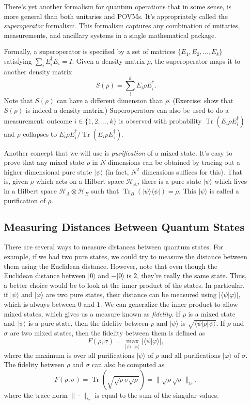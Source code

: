 \documentclass[11pt]{report}
\theoremstyle{plain}
\theoremstyle{definition}
\renewcommand{\bra}[1]{\langle#1|}
\renewcommand{\ket}[1]{|#1\rangle}
\newcommand{\braket}[2]{\langle#1|#2\rangle}
\newcommand{\ketbra}[2]{|#1\rangle\!\langle#2|}
\newcommand{\tensor}{\otimes}
\newcommand{\Tr}{\operatorname{Tr}}
\begin{document}
There's yet another formalism for quantum operations that in some sense, is more general than both unitaries and POVMs.  It's appropriately called the \emph{superoperator} formalism. This formalism captures any combination of unitaries, measurements, and ancillary systems in a single mathematical package.

Formally, a superoperator is specified by a set of matrices $\{E_1, E_2, \ldots, E_k\}$ satisfying $\sum_i E_i^\dagger E_i = I$. Given a density matrix $\rho$, the superoperator maps it to another density matrix
\[
S(\rho) = \sum_i^k E_i \rho E_i^\dagger.
\]
Note that $S(\rho)$ can have a different dimension than $\rho$. (Exercise: show that $S(\rho)$ is indeed a density matrix.) Superoperators can also be used to do a measurement: outcome $i \in \{1,2,\ldots, k\}$ is observed with probability $\Tr(E_i \rho E_i^\dagger)$ and $\rho$ collapses to $E_i \rho E_i^\dagger / \Tr(E_i \rho E_i^\dagger)$.

Another concept that we will use is  \emph{purification} of a mixed state. It's easy to prove that any mixed state $\rho$ in $N$ dimensions can be obtained by tracing out a higher dimensional pure state $\ket{\psi}$ (in fact, $N^2$ dimensions suffices for this). That is, given $\rho$ which acts on a Hilbert space $\mathcal{H}_A$, there is a pure state $\ket{\psi}$ which lives in a Hilbert space $\mathcal{H}_A \tensor \mathcal{H}_B$ such that $\Tr_B(\ketbra{\psi}{\psi}) = \rho$. This $\ket{\psi}$ is called a purification of $\rho$.


\subsection{Measuring Distances Between Quantum States}

There are several ways to measure distances between quantum states. For example, if we had two pure states, we could try to measure the distance between them using the Euclidean distance. However, note that even though the Euclidean distance between $\ket{0}$ and $-\ket{0}$ is $2$, they're really the same state. Thus, a better choice would be to look at the inner product of the states. In particular, if $\ket{\psi}$ and $\ket{\varphi}$ are two pure states, their distance can be measured using $|\braket{\psi}{\varphi}|$, which is always between $0$ and $1$. We can generalize the inner product to allow mixed states, which gives us a measure known as \emph{fidelity}. If $\rho$ is a mixed state and $\ket{\psi}$ is a pure state, then the fidelity between $\rho$ and $\ket{\psi}$ is $\sqrt{ \bra{\psi} \rho \ket{\psi} }$. If $\rho$ and $\sigma$ are two mixed states, then the fidelity between them is defined as
\[
F(\rho, \sigma) = \max_{\ket{\psi}, \ket{\varphi}} | \braket{\psi}{\varphi} |,
\]
where the maximum is over all purifications $\ket{\psi}$ of $\rho$ and all purifications $\ket{\varphi}$ of $\sigma$. The fidelity between $\rho$ and $\sigma$ can also be computed as
\[
F(\rho, \sigma) = \Tr\left(\sqrt{ \sqrt{\rho} \sigma \sqrt{\rho}}\right) = \| \sqrt{\rho} \sqrt{\sigma} \|_{tr},
\]
where the trace norm $\| \cdot \|_{tr}$ is equal to the sum of the singular values.
\end{document}
